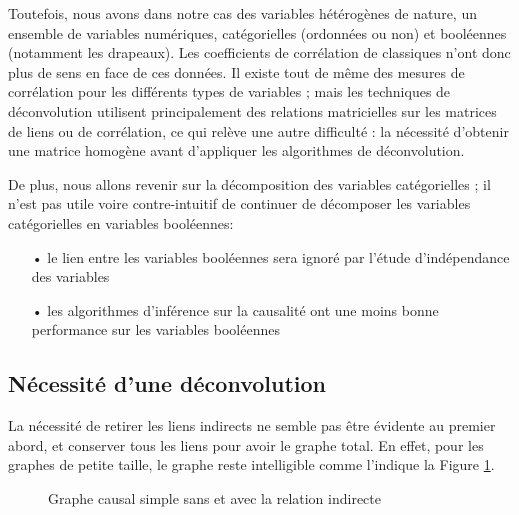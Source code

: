 \documentclass[11pt,fleqn,openany,frenchb]{book} %
\begin{document}
Toutefois, nous avons dans notre cas des variables hétérogènes de nature, un ensemble de variables numériques, catégorielles (ordonnées ou non) et booléennes (notamment les drapeaux). Les coefficients de corrélation de classiques n'ont donc plus de sens en face de ces données. Il existe tout de même des mesures de corrélation pour les différents types de variables ; mais les techniques de déconvolution utilisent principalement des relations matricielles sur les matrices de liens ou de corrélation, ce qui relève une autre difficulté : la nécessité d'obtenir une matrice homogène avant d'appliquer les algorithmes de déconvolution.\par

De plus, nous allons revenir sur la décomposition des variables catégorielles ; il n'est pas utile voire contre-intuitif de continuer de décomposer les variables catégorielles en variables booléennes:
\begin{itemize}
\item[•] le lien entre les variables booléennes sera ignoré par l'étude d'indépendance des variables
\item[•] les algorithmes d'inférence sur la causalité ont une moins bonne performance sur les variables booléennes
\end{itemize}


\subsection{Nécessité d'une déconvolution}
La nécessité de retirer les liens indirects ne semble pas être évidente au premier abord, et conserver tous les liens pour avoir le graphe total. En effet, pour les graphes de petite taille, le graphe reste intelligible comme l'indique la Figure \ref{fig:graph-in-direct}. \par

\begin{figure}[!h]
  \centering
  \hspace{2pt}
  \caption{Graphe causal simple sans et avec la relation indirecte}
  \label{fig:graph-in-direct}
\end{figure}
\end{document}

